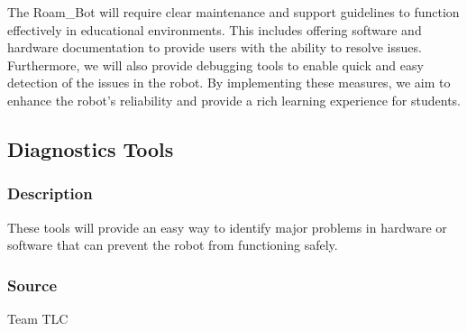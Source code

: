 

The Roam\_Bot will require clear maintenance and support guidelines to function effectively in educational environments. This includes offering software and hardware documentation to provide users with the ability to resolve issues. Furthermore, we will also provide debugging tools to enable quick and easy detection of the issues in the robot. By implementing these measures, we aim to enhance the robot's reliability and provide a rich learning experience for students.



\subsection{Diagnostics Tools}
\subsubsection{Description}
These tools will provide an easy way to identify major problems in hardware or software that can prevent the robot from functioning safely.

\subsubsection{Source}
Team TLC

